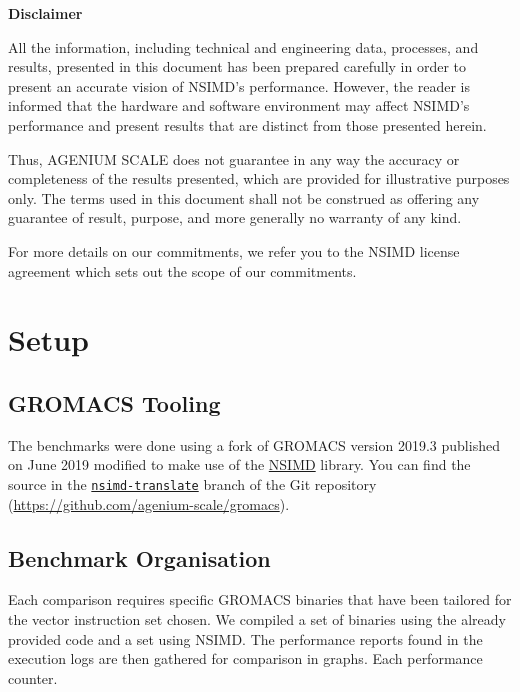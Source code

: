 \documentclass[a4paper,11pt]{article}
\newcommand{\gromacs}{GROMACS}
\newcommand{\nsimd}{NSIMD}
\newcommand{\ageniumscale}{AGENIUM SCALE}
\begin{document}
\begin{mdframed}{
  \textbf{Disclaimer}

  All the information, including technical and engineering data, processes,
  and results, presented in this document has been prepared carefully in
  order to present an accurate vision of NSIMD's performance. However, the
  reader is informed that the hardware and software environment may affect
  NSIMD's performance and present results that are distinct from those
  presented herein.

  Thus, \ageniumscale{} does not guarantee in any way the accuracy or
  completeness of the results presented, which are provided for illustrative
  purposes only. The terms used in this document shall not be construed as
  offering any guarantee of result, purpose, and more generally no warranty of
  any kind.

  For more details on our commitments, we refer you to the NSIMD license
  agreement which sets out the scope of our commitments.
}\end{mdframed}

\section{Setup}%
\label{sec:setup}

\subsection{\gromacs{} Tooling}

The benchmarks were done using a fork of \gromacs{} version 2019.3 published on
June 2019 modified to make use of the
\href{https://github.com/agenium-scale/nsimd#nsimd}{\nsimd{}} library. You can
find the source in the
\href{https://github.com/agenium-scale/gromacs/tree/nsimd-translate}
{\texttt{nsimd-translate}} branch of the Git repository
(\href{https://github.com/agenium-scale/gromacs}
{https://github.com/agenium-scale/gromacs}).

\subsection{Benchmark Organisation}

Each comparison requires specific \gromacs{} binaries that have been tailored
for the vector instruction set chosen. We compiled a set of binaries using the
already provided code and a set using \nsimd{}. The performance reports found
in the execution logs are then gathered for comparison in graphs. Each
performance counter.
\end{document}

